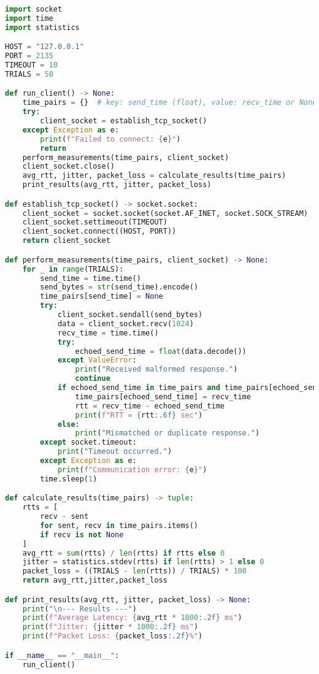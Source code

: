 \footnotesize
\begin{lstlisting}[language=python, breaklines=true, breakatwhitespace=true, showstringspaces=false]
import socket
import time
import statistics

HOST = "127.0.0.1"
PORT = 2135
TIMEOUT = 10
TRIALS = 50

def run_client() -> None:
    time_pairs = {}  # key: send_time (float), value: recv_time or None
    try:
        client_socket = establish_tcp_socket()
    except Exception as e:
        print(f"Failed to connect: {e}")
        return
    perform_measurements(time_pairs, client_socket)
    client_socket.close()
    avg_rtt, jitter, packet_loss = calculate_results(time_pairs)
    print_results(avg_rtt, jitter, packet_loss)

def establish_tcp_socket() -> socket.socket:
    client_socket = socket.socket(socket.AF_INET, socket.SOCK_STREAM)
    client_socket.settimeout(TIMEOUT)
    client_socket.connect((HOST, PORT))
    return client_socket

def perform_measurements(time_pairs, client_socket) -> None:
    for _ in range(TRIALS):
        send_time = time.time()
        send_bytes = str(send_time).encode()
        time_pairs[send_time] = None
        try:
            client_socket.sendall(send_bytes)
            data = client_socket.recv(1024)
            recv_time = time.time()
            try:
                echoed_send_time = float(data.decode())
            except ValueError:
                print("Received malformed response.")
                continue
            if echoed_send_time in time_pairs and time_pairs[echoed_send_time] is None:
                time_pairs[echoed_send_time] = recv_time
                rtt = recv_time - echoed_send_time
                print(f"RTT = {rtt:.6f} sec")
            else:
                print("Mismatched or duplicate response.")
        except socket.timeout:
            print("Timeout occurred.")
        except Exception as e:
            print(f"Communication error: {e}")
        time.sleep(1)

def calculate_results(time_pairs) -> tuple:
    rtts = [
        recv - sent
        for sent, recv in time_pairs.items()
        if recv is not None
    ]
    avg_rtt = sum(rtts) / len(rtts) if rtts else 0
    jitter = statistics.stdev(rtts) if len(rtts) > 1 else 0
    packet_loss = ((TRIALS - len(rtts)) / TRIALS) * 100
    return avg_rtt,jitter,packet_loss

def print_results(avg_rtt, jitter, packet_loss) -> None:
    print("\n--- Results ---")
    print(f"Average Latency: {avg_rtt * 1000:.2f} ms")
    print(f"Jitter: {jitter * 1000:.2f} ms")
    print(f"Packet Loss: {packet_loss:.2f}%")

if __name__ == "__main__":
    run_client()

\end{lstlisting}
\normalsize
